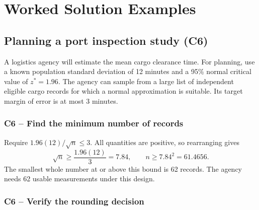 	\section{Worked Solution Examples}
	\label{sec:worked-solution-examples}


	\subsection{Planning a port inspection study (C6)}
	\label{prob:c6-1}

	A logistics agency will estimate the mean cargo clearance time. For planning, use a known population standard deviation of 12 minutes and a 95\% normal critical value of $z^*=1.96$. The agency can sample from a large list of independent eligible cargo records for which a normal approximation is suitable. Its target margin of error is at most 3 minutes.


	\clearpage

	\label{sol:c6-1-a}
	\subsubsection*{C6 -- Find the minimum number of records}

	Require $1.96(12)/\sqrt n\le 3$. All quantities are positive, so rearranging gives
	\[
	\sqrt n\ge \frac{1.96(12)}{3}=7.84,
	\qquad n\ge 7.84^2=61.4656.
	\]
	The smallest whole number at or above this bound is 62 records. The agency needs 62 usable measurements under this design.


	\label{sol:c6-1-b}
	\subsubsection*{C6 -- Verify the rounding decision}

